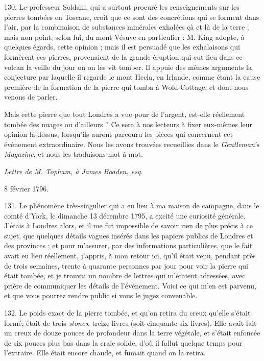 \documentclass[a4paper, 11pt, oneside, polutonikogreek, french]{article}
\begin{document}
130. Le professeur Soldani, qui a surtout procuré les renseignements sur les pierres tombées en Toscane, croit que ce sont des concrétions qui se forment dans l'air, par la combinaison de substances minérales exhalées çà et là de la terre ; mais non point, selon lui, du mont Vésuve en particulier : M. King adopte, à quelques égards, cette opinion ; mais il est persuadé que les exhalaisons qui formèrent ces pierres, provenaient de la grande éruption qui eut lieu dans ce volcan la veille du jour où on les vit tomber. Il appuie des mêmes arguments la conjecture par laquelle il regarde le mont Hecla, en Irlande, comme étant la cause première de la formation de la pierre qui tomba à Wold-Cottage, et dont nous venons de parler.

Mais cette pierre que tout Londres a vue pour de l'argent, est-elle réellement tombée des nuages ou d'ailleurs ? Ce sera à nos lecteurs à fixer eux-mêmes leur opinion là-dessus, lorsqu'ils auront parcouru les pièces qui concernent cet événement extraordinaire. Nous les avons trouvées recueillies dans le \emph{Gentleman's Magazine}, et nous les traduisons mot à mot.

\begin{center}
\emph{Lettre de M. Topham, à James Boaden, esq.}

8 février 1796.
\end{center}

131. Le phénomène très-singulier qui a eu lieu à ma maison de campagne, dans le comté d'York, le dimanche 13 décembre 1795, a excité une curiosité générale. J'étais à Londres alors, et il me fut impossible de savoir rien de plus précis à ce sujet, que quelques détails vagues insérés dans les papiers publics de Londres et des provinces ; et pour m'assurer, par des informations particulières, que le fait avait eu lieu réellement, j'appris, à mon retour ici, qu'il était venu, pendant près de trois semaines, trente à quarante personnes par jour pour voir la pierre qui était tombée, et je trouvai un nombre de lettres qui m'étaient adressées, avec prière de communiquer les détails de l'événement. Voici ce qui m'en est parvenu, et que vous pourrez rendre public si vous le jugez convenable.

132. Le poids exact de la pierre tombée, et qu'on retira du creux qu'elle s'était formé, était de trois \emph{stones}, treize livres (soit cinquante-six livres). Elle avait fait un creux de douze pouces de profondeur dans la terre végétale, et s'était enfoncée de six pouces plus bas dans la craie solide, d'où il fallut quelque temps pour l'extraire. Elle était encore chaude, et fumait quand on la retira.
\end{document}
